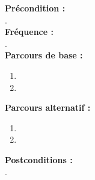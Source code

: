 \documentclass[../rapport.tex]{subfiles}
\begin{document}
\textbf{Précondition :} \\
. \\

\textbf{Fréquence :} \\
. \\

\textbf{Parcours de base :} \\
\begin{enumerate}
    \item 
    \item 
\end{enumerate}
\bigskip

\textbf{Parcours alternatif :}
\begin{enumerate}
    \item 
    \item 
\end{enumerate}

\textbf{Postconditions :} \\
. \\

\newpage
\end{document}
